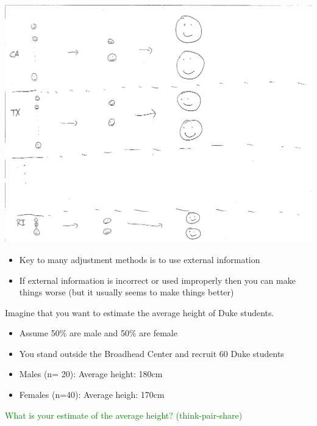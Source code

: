 \documentclass[aspectratio=169]{beamer}
\begin{document}
\begin{frame}

\begin{center}
\includegraphics[height=\textheight]{figures/stratified_sampling_cps}
\end{center}

\end{frame}
\begin{frame}

\begin{itemize}
\item Key to many adjustment methods is to use external information
\pause
\item If external information is incorrect or used improperly then you can make things worse (but it usually seems to make things better)
\end{itemize}

\end{frame}
\begin{frame}

Imagine that you want to estimate the average height of Duke students.\\
\begin{itemize}
\item Assume 50\% are male and 50\% are female
\item You stand outside the Broadhead Center and recruit 60 Duke students
\item Males (n= 20): Average height: 180cm
\item Females (n=40): Average heigh: 170cm
\end{itemize}
\textcolor{green}{What is your estimate of the average height? (think-pair-share)}

\end{frame}
\end{document}

